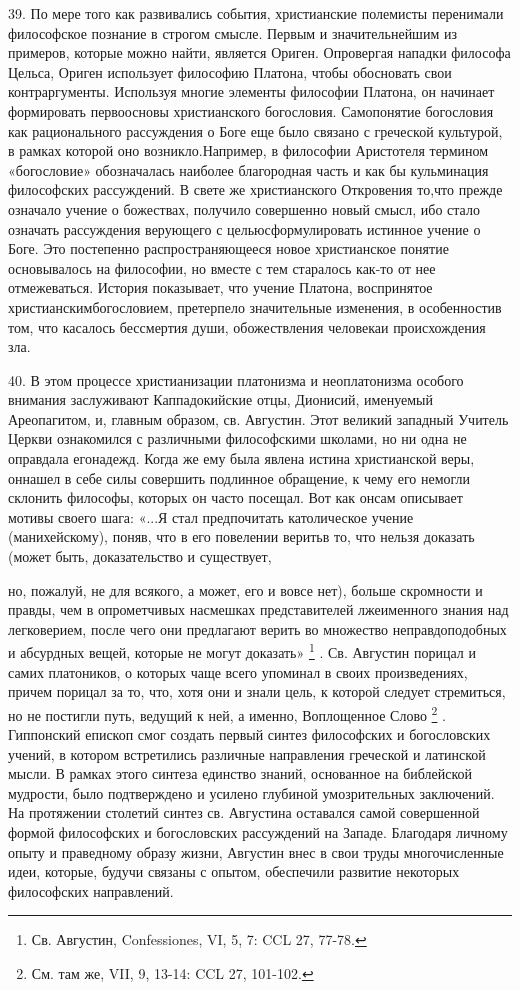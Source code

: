 \documentclass[a5paper,10pt]{article}
\begin{document}
39. По мере того как развивались события, христианские полемисты перенимали
философское познание в строгом смысле. Первым и значительнейшим из примеров,
которые можно найти, является Ориген. Опровергая нападки философа Цельса,
Ориген использует философию Платона, чтобы обосновать свои контраргументы.
Используя многие элементы философии Платона, он начинает формировать
первоосновы христианского богословия. Самопонятие богословия как рационального
рассуждения о Боге еще было связано с греческой культурой, в рамках которой оно
возникло.Например, в философии Аристотеля термином «богословие» обозначалась
наиболее благородная часть и как бы кульминация философских рассуждений. В
свете же христианского Откровения то,что прежде означало учение о божествах,
получило совершенно новый смысл, ибо стало означать рассуждения верующего с
цельюсформулировать истинное учение о Боге. Это постепенно распространяющееся
новое христианское понятие основывалось на философии, но вместе с тем старалось
как-то от нее отмежеваться. История показывает, что учение Платона, воспринятое
христианскимбогословием, претерпело значительные изменения, в особенностив том,
что касалось бессмертия души, обожествления человекаи происхождения зла.

40. В этом процессе христианизации платонизма и неоплатонизма особого внимания
заслуживают Каппадокийские отцы, Дионисий, именуемый Ареопагитом, и, главным
образом, св. Августин. Этот великий западный Учитель Церкви ознакомился с
различными философскими школами, но ни одна не оправдала егонадежд. Когда же
ему была явлена истина христианской веры, оннашел в себе силы совершить
подлинное обращение, к чему его немогли склонить философы, которых он часто
посещал. Вот как онсам описывает мотивы своего шага: «...Я стал предпочитать
католическое учение (манихейскому), поняв, что в его повелении веритьв то, что
нельзя доказать (может быть, доказательство и существует,

но, пожалуй, не для всякого, а может, его и вовсе нет), больше скромности и
правды, чем в опрометчивых насмешках представителей лжеименного знания над
легковерием, после чего они предлагают верить во множество неправдоподобных и
абсурдных вещей, которые не могут доказать» \footnote{Св. Августин,
Confessiones, VI, 5, 7: CCL 27, 77-78.}  . Св. Августин порицал и самих
платоников, о которых чаще всего упоминал в своих произведениях, причем порицал
за то, что, хотя они и знали цель, к которой следует стремиться, но не постигли
путь, ведущий к ней, а именно, Воплощенное Слово \footnote{См. там же, VII, 9,
13-14: CCL 27, 101-102.} . Гиппонский епископ смог создать первый синтез
философских и богословских учений, в котором встретились различные направления
греческой и латинской мысли. В рамках этого синтеза единство знаний, основанное
на библейской мудрости, было подтверждено и усилено глубиной умозрительных
заключений. На протяжении столетий синтез св. Августина оставался самой
совершенной формой философских и богословских рассуждений на Западе. Благодаря
личному опыту и праведному образу жизни, Августин внес в свои труды
многочисленные идеи, которые, будучи связаны с опытом, обеспечили развитие
некоторых философских направлений.
\end{document}

